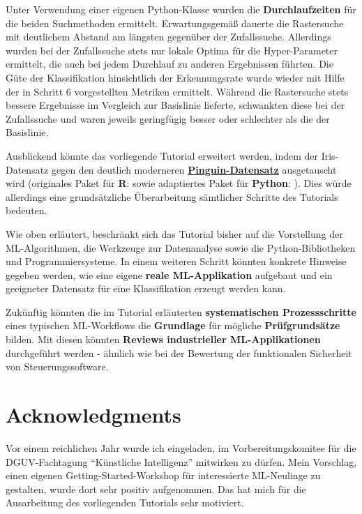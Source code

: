 \documentclass [oneside,10pt,a4paper,ngerman,BCOR10mm,headsepline,parindent,final]{scrartcl}
\begin{document}
Unter Verwendung einer eigenen Python-Klasse wurden die
\textbf{Durchlaufzeiten} für die beiden Suchmethoden ermittelt.
Erwartungsgemäß dauerte die Rastersuche mit deutlichem Abstand am
längsten gegenüber der Zufallssuche. Allerdings wurden bei der
Zufallssuche stets nur lokale Optima für die Hyper-Parameter ermittelt,
die auch bei jedem Durchlauf zu anderen Ergebnissen führten. Die Güte
der Klassifikation hinsichtlich der Erkennungsrate wurde wieder mit
Hilfe der in Schritt 6 vorgestellten Metriken ermittelt. Während die
Rastersuche stets bessere Ergebnisse im Vergleich zur Basislinie
lieferte, schwankten diese bei der Zufallssuche und waren jeweils
geringfügig besser oder schlechter als die der Basislinie.

Ausblickend könnte das vorliegende Tutorial erweitert werden, indem der
Iris-Datensatz gegen den deutlich moderneren
\textbf{\href{https://github.com/mcnakhaee/palmerpenguins}{Pinguin-Datensatz}}
ausgetauscht wird (originales Paket für \textbf{R}:
\cite{palmerpenguins_R_2020} sowie adaptiertes Paket für
\textbf{Python}: \cite{palmerpenguins_Python_2020}). Dies würde
allerdings eine grundsätzliche Überarbeitung sämtlicher Schritte des
Tutorials bedeuten.

Wie oben erläutert, beschränkt sich das Tutorial bisher auf die
Vorstellung der ML-Algorithmen, die Werkzeuge zur Datenanalyse sowie die
Python-Bibliotheken und Programmiersysteme. In einem weiteren Schritt
könnten konkrete Hinweise gegeben werden, wie eine eigene \textbf{reale
ML-Applikation} aufgebaut und ein geeigneter Datensatz für eine
Klassifikation erzeugt werden kann.

Zukünftig könnten die im Tutorial erläuterten \textbf{systematischen
Prozessschritte} eines typischen ML-Workflows die \textbf{Grundlage} für
mögliche \textbf{Prüfgrundsätze} bilden. Mit diesen könnten
\textbf{Reviews industrieller ML-Applikationen} durchgeführt werden -
ähnlich wie bei der Bewertung der funktionalen Sicherheit von
Steuerungssoftware.

    \hypertarget{acknowledgments}{%
\section{Acknowledgments}\label{acknowledgments}}

Vor einem reichlichen Jahr wurde ich eingeladen, im Vorbereitungskomitee
für die DGUV-Fachtagung ``Künstliche Intelligenz'' mitwirken zu dürfen.
Mein Vorschlag, einen eigenen Getting-Started-Workshop für interessierte
ML-Neulinge zu gestalten, wurde dort sehr positiv aufgenommen. Das hat
mich für die Ausarbeitung des vorliegenden Tutorials sehr motiviert.
\end{document}
